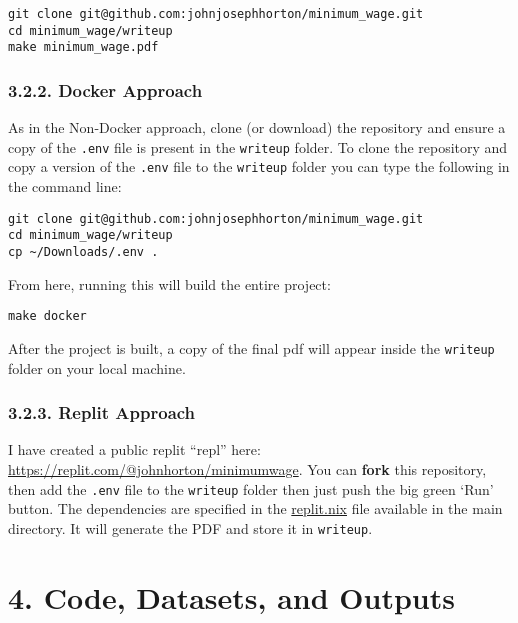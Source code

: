 \documentclass[10pt]{article}
\begin{document}
\begin{verbatim}
git clone git@github.com:johnjosephhorton/minimum_wage.git
cd minimum_wage/writeup
make minimum_wage.pdf
\end{verbatim}

\subsubsection*{3.2.2. Docker Approach}

As in the Non-Docker approach, clone (or download) the repository and ensure a copy of the \texttt{.env} file is present in the \texttt{writeup} folder.
To clone the repository and copy a version of the \texttt{.env} file to the \texttt{writeup} folder you can type the following in the command line:

\begin{verbatim}
git clone git@github.com:johnjosephhorton/minimum_wage.git
cd minimum_wage/writeup
cp ~/Downloads/.env .
\end{verbatim}

From here, running this will build the entire project:

\begin{verbatim}
make docker
\end{verbatim}

After the project is built, a copy of the final pdf will appear inside the \texttt{writeup} folder on your local machine.

\subsubsection*{3.2.3. Replit Approach}

I have created a public replit ``repl'' here: \href{https://replit.com/@johnhorton/minimumwage}{https://replit.com/@johnhorton/minimumwage}.
You can \textbf{fork} this repository, then add the \texttt{.env} file to the \texttt{writeup} folder then just push the big green `Run' button.
The dependencies are specified in the \href{https://www.github.com/johnjosephhorton/minimum_wage/blob/main/replit.nix}{replit.nix} file available in the main directory.
It will generate the PDF and store it in \texttt{writeup}.

\vspace{1em}
\section*{4. Code, Datasets, and Outputs}
\end{document}
